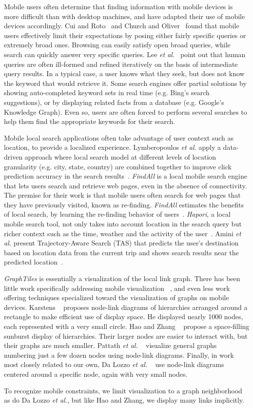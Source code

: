 
Mobile users often determine that finding information with mobile devices is more difficult than with desktop machines, and have adapted their use of mobile devices accordingly.
Cui and Roto~\cite{Cui:2008} and Church and Oliver~\cite{Church:2011} found that mobile users effectively limit their expectations by posing either fairly specific queries or extremely broad ones. Browsing can easily satisfy open broad queries, while search can quickly answer very specific queries. Lee \textit{et al.}~\cite{Lee:2012} point out that human queries are often ill-formed and refined iteratively on the basis of intermediate query results. In a typical case, a user knows what they seek, but does not know the keyword that would retrieve it. Some search engines offer partial solutions by showing auto-completed keyword sets in real time (e.g. Bing's search suggestions), or by displaying related facts from a database (e.g. Google's Knowledge Graph). Even so, users are often forced to perform several searches to help them find the appropriate keywords for their search.

Mobile local search applications often take advantage of user context such as location,  to provide a localized experience. Lymberopoulos \textit{et al.} apply a data-driven approach where local search model at different levels of location granularity (e.g. city, state, country) are combined together to improve click prediction accuracy in the search results~\cite{Lymberopoulos:2011}. \textit{FindAll} is a local mobile search engine that lets users search and retrieve web pages, even in the absence of connectivity. The premise for their work is that mobile users often search for web pages that they have previously visited, known as re-finding. \textit{FindAll} estimates the benefits of local search, by learning the re-finding behavior of users~\cite{Balasubramanian:2012}. \textit{Hapori}, a local mobile search tool,  not only takes into account location in the search query but richer context such as the time, weather and the activity of the user~\cite{Lane:2010}. Amini \textit{et al.} present Trajectory-Aware Search (TAS) that predicts the user's destination based on location data from the current trip and shows search results near the predicted location~\cite{Amini:2012}.

\textit{GraphTiles} is essentially a visualization of the local link graph. There has been little work specifically addressing mobile visualization ~\cite{RefWorks:658}, and even less work offering techniques specialized toward the visualization of graphs on mobile devices. Karstens ~\cite{RefWorks:908} proposes node-link diagrams of hierarchies arranged around a rectangle to make efficient use of display space. He displayed nearly 1000 nodes, each represented with a very small circle. Hao and Zhang ~\cite{RefWorks:906} propose a space-filling sunburst display of hierarchies. Their larger nodes are easier to interact with, but their graphs are much smaller. Pattath \textit{et al.} ~\cite{RefWorks:896} visualize general graphs numbering just a few dozen nodes using node-link diagrams. Finally, in work most closely related to our own, Da Lozzo \textit{et al.} ~\cite{springerlink:10.1007/978-3-642-18469-7-14} use node-link diagrams centered around a specific node, again with very small nodes. 

To recognize mobile constraints, we limit visualization to a graph neighborhood as do Da Lozzo \textit{et al.}, but like Hao and Zhang, we display many links implicitly.

